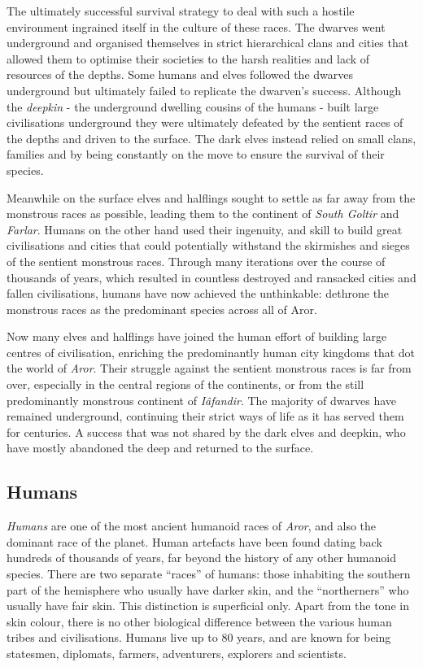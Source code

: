 The ultimately successful survival strategy to deal with such a hostile
environment ingrained itself in the culture of these races. The dwarves went
underground and organised themselves in strict hierarchical clans and cities
that allowed them to optimise their societies to the harsh realities and lack
of resources of the depths. Some humans and elves followed the dwarves
underground but ultimately failed to replicate the dwarven's success.
Although the \emph{deepkin} - the underground dwelling cousins of
the humans - built large civilisations underground they were ultimately
defeated by the sentient races of the depths and driven to the surface. The
dark elves instead relied on small clans, families and by being constantly on
the move to ensure the survival of their species.

Meanwhile on the surface elves and halflings sought to settle as far away from
the monstrous races as possible, leading them to the continent of \emph{South
Goltir} and \emph{Farlar}. Humans on the other hand used their ingenuity, and
skill to build great civilisations and cities that could potentially withstand
the skirmishes and sieges of the sentient monstrous races. Through many
iterations over the course of thousands of years, which resulted in countless
destroyed and ransacked cities and fallen civilisations, humans have now
achieved the unthinkable: dethrone the monstrous races as the predominant
species across all of Aror.

Now many elves and halflings have joined the human effort of building large
centres of civilisation, enriching the predominantly human city kingdoms that
dot the world of \emph{Aror}. Their struggle against the sentient monstrous
races is far from over, especially in the central regions of the continents,
or from the still predominantly monstrous continent of \emph{Iâfandir}.  The
majority of dwarves have remained underground, continuing their strict ways of
life as it has served them for centuries. A success that was not shared by the
dark elves and deepkin, who have mostly abandoned the deep and returned to the
surface.

\subsection*{Humans}

\emph{Humans} are one of the most ancient humanoid races of \emph{Aror}, and
also the dominant race of the planet. Human artefacts have been found dating
back hundreds of thousands of years, far beyond the history of any other
humanoid species. There are two separate ``races'' of humans: those inhabiting
the southern part of the hemisphere who usually have darker skin, and the
``northerners'' who usually have fair skin. This distinction is superficial
only. Apart from the tone in skin colour, there is no other biological
difference between the various human tribes and civilisations. Humans live up
to 80 years, and are known for being statesmen, diplomats, farmers,
adventurers, explorers and scientists.


